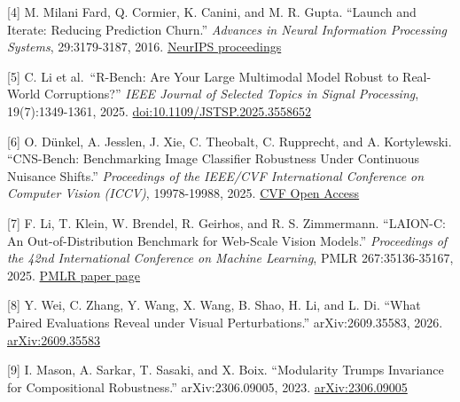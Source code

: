 \documentclass[10pt,twocolumn]{article}
\begin{document}
{[}4{]} M. Milani Fard, Q. Cormier, K. Canini, and M. R. Gupta. ``Launch
and Iterate: Reducing Prediction Churn.'' \emph{Advances in Neural
Information Processing Systems}, 29:3179-3187, 2016.
\href{https://proceedings.neurips.cc/paper_files/paper/2016/hash/dc5c768b5dc76a084531934b34601977-Abstract.html}{NeurIPS
proceedings}

{[}5{]} C. Li et al.~``R-Bench: Are Your Large Multimodal Model Robust
to Real-World Corruptions?'' \emph{IEEE Journal of Selected Topics in
Signal Processing}, 19(7):1349-1361, 2025.
\href{https://doi.org/10.1109/JSTSP.2025.3558652}{doi:10.1109/JSTSP.2025.3558652}

{[}6{]} O. Dünkel, A. Jesslen, J. Xie, C. Theobalt, C. Rupprecht, and A.
Kortylewski. ``CNS-Bench: Benchmarking Image Classifier Robustness Under
Continuous Nuisance Shifts.'' \emph{Proceedings of the IEEE/CVF
International Conference on Computer Vision (ICCV)}, 19978-19988, 2025.
\href{https://openaccess.thecvf.com/content/ICCV2025/html/Dunkel_CNS-Bench_Benchmarking_Image_Classifier_Robustness_Under_Continuous_Nuisance_Shifts_ICCV_2025_paper.html}{CVF
Open Access}

{[}7{]} F. Li, T. Klein, W. Brendel, R. Geirhos, and R. S. Zimmermann.
``LAION-C: An Out-of-Distribution Benchmark for Web-Scale Vision
Models.'' \emph{Proceedings of the 42nd International Conference on
Machine Learning}, PMLR 267:35136-35167, 2025.
\href{https://proceedings.mlr.press/v267/li25aw.html}{PMLR paper page}

{[}8{]} Y. Wei, C. Zhang, Y. Wang, X. Wang, B. Shao, H. Li, and L. Di.
``What Paired Evaluations Reveal under Visual Perturbations.''
arXiv:2609.35583, 2026.
\href{https://arxiv.org/abs/2609.35583}{arXiv:2609.35583}

{[}9{]} I. Mason, A. Sarkar, T. Sasaki, and X. Boix. ``Modularity Trumps
Invariance for Compositional Robustness.'' arXiv:2306.09005, 2023.
\href{https://arxiv.org/abs/2306.09005}{arXiv:2306.09005}
\end{document}
